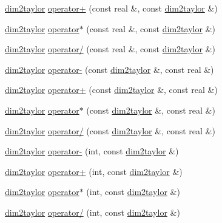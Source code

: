 \begin{DoxyCompactItemize}
\item 
\hyperlink{classtaylor_1_1dim2taylor}{dim2taylor} \hyperlink{classtaylor_1_1dim2taylor_a6d1538c756688160d8c101f3df990e6c}{operator+} (const real \&, const \hyperlink{classtaylor_1_1dim2taylor}{dim2taylor} \&)
\item 
\hyperlink{classtaylor_1_1dim2taylor}{dim2taylor} \hyperlink{classtaylor_1_1dim2taylor_a4e87158c70647066f1c4d6b32f91ee10}{operator$\ast$} (const real \&, const \hyperlink{classtaylor_1_1dim2taylor}{dim2taylor} \&)
\item 
\hyperlink{classtaylor_1_1dim2taylor}{dim2taylor} \hyperlink{classtaylor_1_1dim2taylor_ab7c059a521398354da079fbe16472b58}{operator/} (const real \&, const \hyperlink{classtaylor_1_1dim2taylor}{dim2taylor} \&)
\item 
\hyperlink{classtaylor_1_1dim2taylor}{dim2taylor} \hyperlink{classtaylor_1_1dim2taylor_a76bdb636ad6d8d93153e4eb536b63dfc}{operator-\/} (const \hyperlink{classtaylor_1_1dim2taylor}{dim2taylor} \&, const real \&)
\item 
\hyperlink{classtaylor_1_1dim2taylor}{dim2taylor} \hyperlink{classtaylor_1_1dim2taylor_a90620b246015f13f1e2b4465e94d2a2c}{operator+} (const \hyperlink{classtaylor_1_1dim2taylor}{dim2taylor} \&, const real \&)
\item 
\hyperlink{classtaylor_1_1dim2taylor}{dim2taylor} \hyperlink{classtaylor_1_1dim2taylor_af7ee67d9c68cbcc00272dabf4217147e}{operator$\ast$} (const \hyperlink{classtaylor_1_1dim2taylor}{dim2taylor} \&, const real \&)
\item 
\hyperlink{classtaylor_1_1dim2taylor}{dim2taylor} \hyperlink{classtaylor_1_1dim2taylor_a6e797966e808641e8bac96bf139c3171}{operator/} (const \hyperlink{classtaylor_1_1dim2taylor}{dim2taylor} \&, const real \&)
\item 
\hyperlink{classtaylor_1_1dim2taylor}{dim2taylor} \hyperlink{classtaylor_1_1dim2taylor_a877e3ffa1e63ba74cfd3fbe2d55c21ef}{operator-\/} (int, const \hyperlink{classtaylor_1_1dim2taylor}{dim2taylor} \&)
\item 
\hyperlink{classtaylor_1_1dim2taylor}{dim2taylor} \hyperlink{classtaylor_1_1dim2taylor_a550701a8d2eb556725616d7d6eda9c32}{operator+} (int, const \hyperlink{classtaylor_1_1dim2taylor}{dim2taylor} \&)
\item 
\hyperlink{classtaylor_1_1dim2taylor}{dim2taylor} \hyperlink{classtaylor_1_1dim2taylor_a0f140f0d741024645798a527ff01b042}{operator$\ast$} (int, const \hyperlink{classtaylor_1_1dim2taylor}{dim2taylor} \&)
\item 
\hyperlink{classtaylor_1_1dim2taylor}{dim2taylor} \hyperlink{classtaylor_1_1dim2taylor_acf30d0d4be12a38fef863cd8fd59b5b0}{operator/} (int, const \hyperlink{classtaylor_1_1dim2taylor}{dim2taylor} \&)

\end{DoxyCompactItemize}
